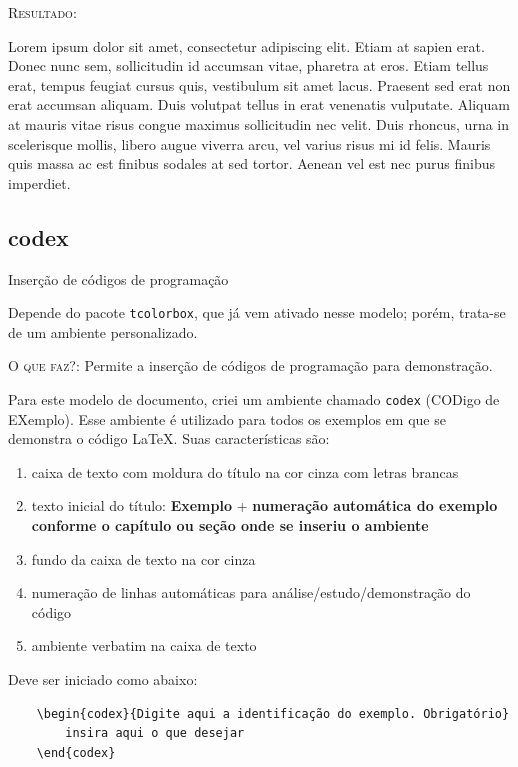 \documentclass[a4paper,12pt,oneside,openright,extrafontsizes,openbib]{memoir}
\begin{document}
{\textsc{Resultado:}

\begin{citel}
	Lorem ipsum dolor sit amet, consectetur adipiscing elit. Etiam at sapien erat. Donec nunc sem, sollicitudin id accumsan vitae, pharetra at eros. Etiam tellus erat, tempus feugiat cursus quis, vestibulum sit amet lacus. Praesent sed erat non erat accumsan aliquam. Duis volutpat tellus in erat venenatis vulputate. Aliquam at mauris vitae risus congue maximus sollicitudin nec velit. Duis rhoncus, urna in scelerisque mollis, libero augue viverra arcu, vel varius risus mi id felis. Mauris quis massa ac est finibus sodales at sed tortor. Aenean vel est nec purus finibus imperdiet.
\end{citel}

\subsection{codex}{Inserção de códigos de programação}

Depende do pacote \verb|tcolorbox|, que já vem ativado nesse modelo; porém, trata-se de um ambiente personalizado.

\textsc{O que faz?}: Permite a inserção de códigos de programação para demonstração.

Para este modelo de documento, criei um ambiente chamado \verb|codex| (CODigo de EXemplo). Esse ambiente é utilizado para todos os exemplos em que se demonstra o código \LaTeX. Suas características são:

\begin{enumerate}
	\item caixa de texto com moldura do título na cor cinza com letras brancas
	\item texto inicial do título: \textbf{Exemplo} + \textbf{numeração automática do exemplo conforme o capítulo ou seção onde se inseriu o ambiente}
	\item fundo da caixa de texto na cor cinza
	\item numeração de linhas automáticas para análise/estudo/demonstração do código
	\item ambiente verbatim na caixa de texto
\end{enumerate} 

Deve ser iniciado como abaixo:

\begin{verbatim}
	\begin{codex}{Digite aqui a identificação do exemplo. Obrigatório}
		insira aqui o que desejar
	\end{codex}
\end{verbatim}

}
\end{document}
